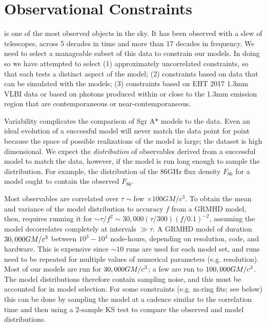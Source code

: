 \section{Observational Constraints}\label{sec:observations}

\sgra is one of the most observed objects in the sky.  It has been observed with a slew of telescopes, across 5 decades in time and more than 17 decades in frequency. We need to select a manageable subset of this data to constrain our models. In doing so we have attempted to select (1) approximately uncorrelated constraints, so that each tests a distinct aspect of the model; (2) constraints based on data that can be simulated with the models; (3) constraints based on EHT 2017 1.3mm VLBI data or based on photons produced within or close to the 1.3mm emission region that are contemporaneous or near-contemporaneous.

Variability complicates the comparison of Sgr A* models to the data. Even an ideal evolution of a successful model will never match the data point for point because the space of possible realizations of the model is large; the dataset is high dimensional.  We expect the {\em distribution} of  observables derived from a successful model to match the data, however, if the model is run long enough to sample the distribution.  For example, the distribution of the $86$GHz flux density $F_{86}$ for a model ought to contain the observed $F_{86}$.

Most observables are correlated over $\tau \sim $few $\times 100 G M/c^3$.  To obtain the mean and variance of the model distribution to accuracy $f$ from a GRMHD model, then, requires running it for $\sim \tau/f^2 \sim 30,000 (\tau/300) (f/0.1)^{-2}$, assuming the model decorrelates completely at intervals $\gg \tau$.  A GRMHD model of duration $30,000 GM/c^3$  between $10^3-10^4$ node-hours, depending on resolution, code, and hardware.  This is expensive since $\sim 10$ runs are used for each model set, and runs need to be repeated for multiple values of numerical parameters (e.g. resolution).  Most of our models are run for $30,000 GM/c^3$; a few are run to $100,000 GM/c^3$.  The model distributions therefore contain sampling noise, and this must be accounted for in model selection.  For some  constraints (e.g. m-ring fits; see below) this can be done by sampling the model at a cadence similar to the correlation time and then using a 2-sample KS test to compare the observed and model distributions.


